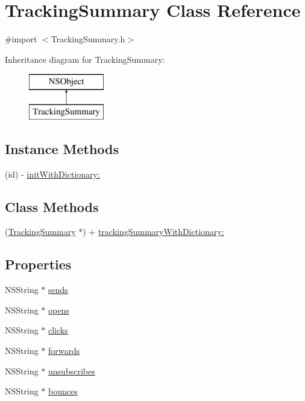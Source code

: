 \hypertarget{interface_tracking_summary}{\section{Tracking\-Summary Class Reference}
\label{interface_tracking_summary}
}


{\ttfamily \#import $<$Tracking\-Summary.\-h$>$}

Inheritance diagram for Tracking\-Summary\-:\begin{figure}[H]
\begin{center}
\leavevmode
\includegraphics[height=2.000000cm]{interface_tracking_summary}
\end{center}
\end{figure}
\subsection*{Instance Methods}
\begin{DoxyCompactItemize}
\item 
(id) -\/ \hyperlink{interface_tracking_summary_ad63933b25b6a2156a9663414caf1c9c9}{init\-With\-Dictionary\-:}
\end{DoxyCompactItemize}
\subsection*{Class Methods}
\begin{DoxyCompactItemize}
\item 
(\hyperlink{interface_tracking_summary}{Tracking\-Summary} $\ast$) + \hyperlink{interface_tracking_summary_a2913d7d6344b34946682551a8e06b763}{tracking\-Summary\-With\-Dictionary\-:}
\end{DoxyCompactItemize}
\subsection*{Properties}
\begin{DoxyCompactItemize}
\item 
N\-S\-String $\ast$ \hyperlink{interface_tracking_summary_af19c3ebbfee6e05a5d972f68cbd9459a}{sends}
\item 
N\-S\-String $\ast$ \hyperlink{interface_tracking_summary_a139b5ef4411752794e384f39b14e6039}{opens}
\item 
N\-S\-String $\ast$ \hyperlink{interface_tracking_summary_a38d3bd63c6b2179c2b85e669f3bf8867}{clicks}
\item 
N\-S\-String $\ast$ \hyperlink{interface_tracking_summary_a148063017db3a9d3a7a39b1c8c95f55e}{forwards}
\item 
N\-S\-String $\ast$ \hyperlink{interface_tracking_summary_a60ccd3e839a9cb9d7d2254fb3bee1c78}{unsubscribes}
\item 
N\-S\-String $\ast$ \hyperlink{interface_tracking_summary_a493a625398f25c6b586924a6efcd2ef3}{bounces}
\end{DoxyCompactItemize}


